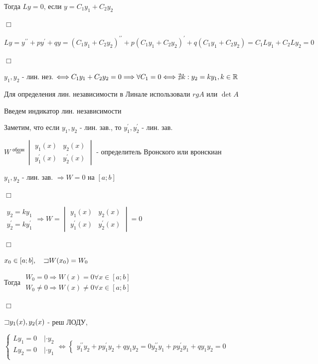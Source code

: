 \documentclass[12pt]{article}
\begin{document}
    Тогда $Ly = 0$, если $y = C_1 y_1 + C_2 y_2$

    $\Box$

    $Ly = y^{\prime\prime} + py^\prime + qy = (C_1 y_1 + C_2 y_2)^{\prime\prime} + p(C_1 y_1 + C_2 y_2)^{\prime} + q(C_1 y_1 + C_2 y_2) = C_1 Ly_1 + C_2 L y_2 = 0$

    $\Box$

    \Def $y_1, y_2$ - лин. нез. $\Longleftrightarrow C_1 y_1 + C_2 y_2 = 0 \Longrightarrow \forall C_1 = 0 \Longleftrightarrow \nexists k : y_2 = k y_1, k \in \mathbb{R}$

    \Mem Для определения лин. независимости в Линале использовали $rg A$ или $\det A$

    Введем индикатор лин. независимости

    Заметим, что если $y_1, y_2$ - лин. зав., то $y_1^\prime, y_2^\prime$ - лин. зав.

    \Def $W \stackrel{\text{обозн}}{=} \begin{vmatrix}y_1(x) & y_2(x) \\ y_1^\prime(x) & y_2^\prime(x)\end{vmatrix}$ - определитель Вронского или вронскиан

     $y_1, y_2$ - лин. зав. $\Longrightarrow W = 0$ на $[a;b]$

    $\Box$

    $\begin{matrix}y_2 = k y_1 \\ y_2^\prime = k y_1^\prime\end{matrix} \Longrightarrow W = \begin{vmatrix}y_1(x) & y_2(x) \\ y_1^\prime(x) & y_2^\prime(x)\end{vmatrix} = 0$

    $\Box$

     $x_0 \in [a;b], \quad \mathord{\sqsupset} W(x_0) = W_0$

    Тогда $\begin{matrix}W_0 = 0 \Longrightarrow W(x) = 0 \forall x \in [a;b] \\
    W_0 \neq 0 \Longrightarrow W(x) \neq 0 \forall x \in [a;b]\end{matrix}$

    $\Box$

    $\mathord{\sqsupset} y_1(x), y_2(x)$ - реш ЛОДУ,

    $\begin{cases}
        Ly_1 = 0 \quad | \cdot y_2 \\
        Ly_2 = 0 \quad | \cdot y_1 \\
    \end{cases} \Longleftrightarrow
    \begin{cases}
        y_1^{\prime\prime} y_2 + py_1^{\prime} y_2 + q y_1 y_2 = 0
        y_2^{\prime\prime} y_1 + py_2^{\prime} y_1 + q y_1 y_2 = 0
    \end{cases}$
\end{document}
